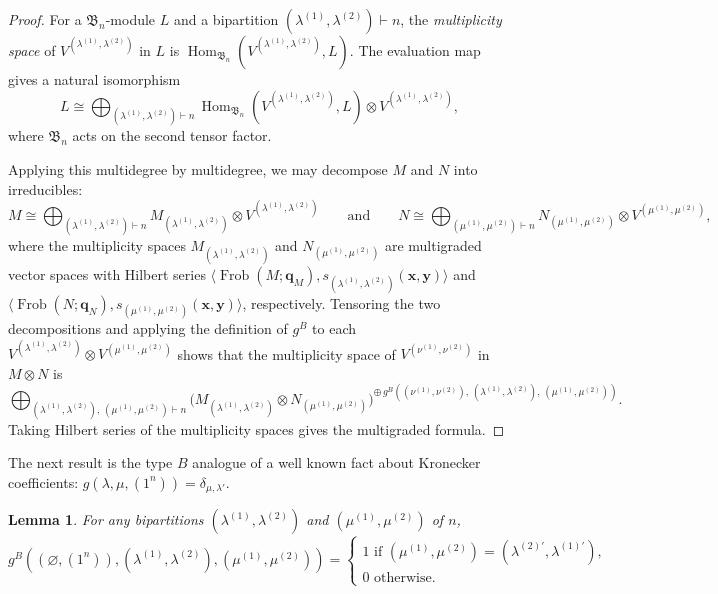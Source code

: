 \documentclass[12pt]{amsart}
\theoremstyle{plain}
\newtheorem{lemma}[theorem]{Lemma}
\theoremstyle{definition}
\DeclareMathOperator{\Frob}{Frob}
\newcommand{\x}{\mathbf{x}}
\newcommand{\y}{\mathbf{y}}
\begin{document}
\begin{proof}
For a $\mathfrak{B}_n$-module $L$ and a bipartition $(\lambda^{(1)},\lambda^{(2)}) \vdash n$, the \emph{multiplicity space} of $V^{(\lambda^{(1)},\lambda^{(2)})}$ in $L$ is $\operatorname{Hom}_{\mathfrak{B}_n}(V^{(\lambda^{(1)},\lambda^{(2)})}, L)$. 
The evaluation map gives a natural isomorphism
\begin{equation}
L \cong \bigoplus_{(\lambda^{(1)},\lambda^{(2)}) \vdash n}
\operatorname{Hom}_{\mathfrak{B}_n}(V^{(\lambda^{(1)},\lambda^{(2)})}, L)
\otimes V^{(\lambda^{(1)},\lambda^{(2)})},
\end{equation}
where $\mathfrak{B}_n$ acts on the second tensor factor.

    Applying this multidegree by multidegree, we may decompose $M$ and $N$ into irreducibles:
    \begin{equation}
        M \cong \bigoplus_{(\lambda^{(1)},\lambda^{(2)}) \vdash n}
        M_{(\lambda^{(1)},\lambda^{(2)})} \otimes V^{(\lambda^{(1)},\lambda^{(2)})}
        \qquad \text{and} \qquad
        N \cong \bigoplus_{(\mu^{(1)},\mu^{(2)}) \vdash n}
        N_{(\mu^{(1)},\mu^{(2)})} \otimes V^{(\mu^{(1)},\mu^{(2)})},
    \end{equation}
    where the multiplicity spaces $M_{(\lambda^{(1)},\lambda^{(2)})}$ and $N_{(\mu^{(1)},\mu^{(2)})}$ are multigraded vector spaces with Hilbert series $\langle \Frob(M; \mathbf{q}_M), s_{(\lambda^{(1)},\lambda^{(2)})}(\x,\y) \rangle$ and $\langle \Frob(N; \mathbf{q}_N), s_{(\mu^{(1)},\mu^{(2)})}(\x,\y) \rangle$, respectively.
    Tensoring the two decompositions and applying the definition of $g^B$ to each $V^{(\lambda^{(1)},\lambda^{(2)})} \otimes V^{(\mu^{(1)},\mu^{(2)})}$ shows that the multiplicity space of $V^{(\nu^{(1)},\nu^{(2)})}$ in $M \otimes N$ is
    \begin{equation}
        \bigoplus_{(\lambda^{(1)},\lambda^{(2)}),\, (\mu^{(1)},\mu^{(2)}) \vdash n}
        \big(M_{(\lambda^{(1)},\lambda^{(2)})} \otimes
        N_{(\mu^{(1)},\mu^{(2)})}\big)^{\oplus\,
        g^B((\nu^{(1)},\nu^{(2)}),\, (\lambda^{(1)},\lambda^{(2)}),\,
        (\mu^{(1)},\mu^{(2)}))}.
    \end{equation}
    Taking Hilbert series of the multiplicity spaces gives the multigraded formula.
\end{proof}

The next result is the type $B$ analogue of a well known fact about Kronecker coefficients: $g(\lambda,\mu,(1^n)) = \delta_{\mu,\lambda'}$.
\begin{lemma}\label{lem:Kronecker-typeB}
For any bipartitions $(\lambda^{(1)},\lambda^{(2)})$ and $(\mu^{(1)},\mu^{(2)})$ of $n$,
    \begin{equation}
        g^B((\varnothing,(1^n)), (\lambda^{(1)},\lambda^{(2)}), (\mu^{(1)},\mu^{(2)})) = \begin{cases}
            1 \text { if } (\mu^{(1)},\mu^{(2)}) = (\lambda^{(2)'},\lambda^{(1)'}),\\
            0 \text { otherwise.}
        \end{cases}
    \end{equation}
\end{lemma}
\end{document}
